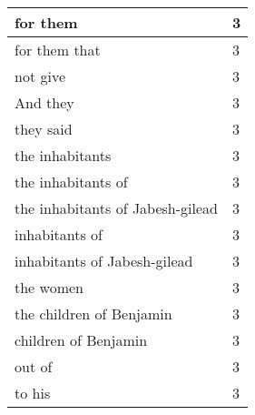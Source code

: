 \begin{center}
\begin{longtable}{|p{3.0in}|p{0.5in}|}
for them & 3\\ \hline 
for them that & 3\\ \hline 
not give & 3\\ \hline 
And they & 3\\ \hline 
they said & 3\\ \hline 
the inhabitants & 3\\ \hline 
the inhabitants of & 3\\ \hline 
the inhabitants of Jabesh-gilead & 3\\ \hline 
inhabitants of & 3\\ \hline 
inhabitants of Jabesh-gilead & 3\\ \hline 
the women & 3\\ \hline 
the children of Benjamin & 3\\ \hline 
children of Benjamin & 3\\ \hline 
out of & 3\\ \hline 
to his & 3\\ \hline 
\end{longtable}
\end{center}





